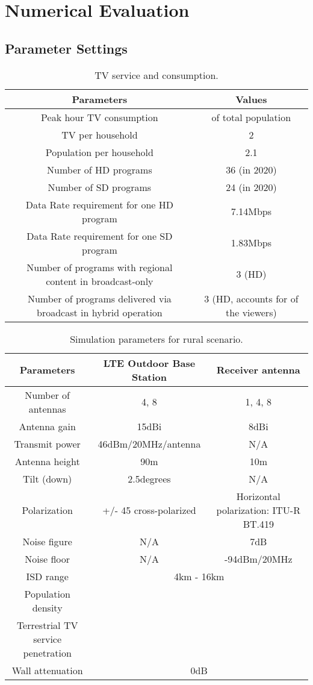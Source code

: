 \documentclass[journal]{IEEEtran}
\begin{document}
\section{Numerical Evaluation}	\label{sec:result}						
\subsection{Parameter Settings}			

\begin{table*}
\caption{TV service and consumption.}\label{table:service}
\centering
\begin{tabular}{|c|c|}
  \hline
Parameters&	Values \\
\hline
Peak hour TV consumption & of total population\\
TV per household	&2\\
Population per household	&2.1\\
Number of HD programs	&36 (in 2020)\\
Number of SD programs	&24 (in 2020)\\
Data Rate requirement for one HD program &7.14Mbps	\\
Data Rate requirement for one SD program &1.83Mbps	\\
Number of programs with regional content in broadcast-only	&3 (HD) \\
Number of programs delivered via broadcast in hybrid operation	&3 (HD, accounts for  of the viewers)\\
\hline
\end{tabular}
\end{table*}

\begin{table*}
\caption{Simulation parameters for rural scenario.}\label{table:rural}
\centering
\begin{tabular}{|c|c|c|}
  \hline
Parameters&	LTE Outdoor Base Station&	Receiver antenna \\
\hline
Number of antennas	&4, 8	&1, 4, 8\\
Antenna gain	&15dBi	&8dBi \\
Transmit power	&46dBm/20MHz/antenna &N/A	\\
Antenna height	&90m	&10m\\
Tilt (down)	&2.5degrees&N/A \\
Polarization	&+/- 45 cross-polarized	&Horizontal polarization: ITU-R BT.419 \cite{BT419}\\
Noise figure	&N/A	&7dB\\
Noise floor	&N/A &-94dBm/20MHz	\\
\hline
ISD range	&\multicolumn{2}{c|}{4km - 16km} \\
Population density 	&\multicolumn{2}{c|}{} \\
Terrestrial TV service penetration	&\multicolumn{2}{c|}{} \\
Wall attenuation  &\multicolumn{2}{c|}{0dB} \\
  \hline
\end{tabular}
\end{table*}
\end{document}
